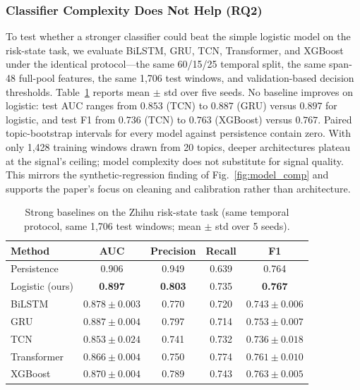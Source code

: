\documentclass[journal]{IEEEtran}
\begin{document}
\subsubsection{Classifier Complexity Does Not Help (RQ2)}

To test whether a stronger classifier could beat the simple logistic model on the risk-state task, we evaluate BiLSTM, GRU, TCN, Transformer, and XGBoost under the identical protocol---the same 60/15/25 temporal split, the same span-48 full-pool features, the same 1,706 test windows, and validation-based decision thresholds. Table~\ref{tab:risk_baselines} reports mean $\pm$ std over five seeds. No baseline improves on logistic: test AUC ranges from $0.853$ (TCN) to $0.887$ (GRU) versus $0.897$ for logistic, and test F1 from $0.736$ (TCN) to $0.763$ (XGBoost) versus $0.767$. Paired topic-bootstrap intervals for every model against persistence contain zero. With only 1,428 training windows drawn from 20 topics, deeper architectures plateau at the signal's ceiling; model complexity does not substitute for signal quality. This mirrors the synthetic-regression finding of Fig.~\ref{fig:model_comp} and supports the paper's focus on cleaning and calibration rather than architecture.

\begin{table}[H]
\caption{Strong baselines on the Zhihu risk-state task (same temporal protocol, same 1,706 test windows; mean $\pm$ std over 5 seeds).}\label{tab:risk_baselines}
\centering
\scriptsize
\begin{tabular}{lcccc}
\toprule
\textbf{Method} & \textbf{AUC} & \textbf{Precision} & \textbf{Recall} & \textbf{F1} \\
\midrule
Persistence & 0.906 & 0.949 & 0.639 & 0.764 \\
Logistic (ours) & \textbf{0.897} & \textbf{0.803} & 0.735 & \textbf{0.767} \\
BiLSTM & $0.878\pm0.003$ & 0.770 & 0.720 & $0.743\pm0.006$ \\
GRU & $0.887\pm0.004$ & 0.797 & 0.714 & $0.753\pm0.007$ \\
TCN & $0.853\pm0.024$ & 0.741 & 0.732 & $0.736\pm0.018$ \\
Transformer & $0.866\pm0.004$ & 0.750 & 0.774 & $0.761\pm0.010$ \\
XGBoost & $0.870\pm0.004$ & 0.789 & 0.743 & $0.763\pm0.005$ \\
\bottomrule
\end{tabular}
\end{table}
\end{document}
